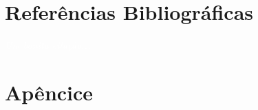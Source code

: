 \documentclass[11pt,fleqn]{book} %
\begin{document}
%

\chapter*{Referências Bibliográficas}\label{referencias}
\vspace{6em}
\begin{flushright}
	\textit{\textcolor{white}{Um bonita citação...}}
\end{flushright}
\vspace{12em}
\printbibliography[heading=bibempty]



%


\chapter{Apêncice}\label{apendice}
\vspace{6em}
\begin{flushright}
	\textit{\textcolor{white}{}}
\end{flushright}
\vspace{12em}
\end{document}
